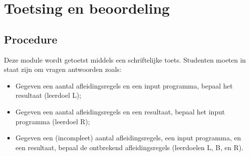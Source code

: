 \section{Toetsing en beoordeling}
	\subsection{Procedure}
		Deze module wordt getoetst middels een schriftelijke toets. Studenten moeten in staat zijn om vragen antwoorden zoals:

		\begin{itemize}
			\item Gegeven een aantal afleidingsregels en een input programma, bepaal het resultaat (leerdoel L);
			\item Gegeven een aantal afleidingsregels en een resultaat, bepaal het input programma (leerdoel R);
			\item Gegeven een (incompleet) aantal afleidingsregels, een input programma, en een resultaat, bepaal de ontbrekend afleidingsregels (leerdoelen L, B, en R).
		\end{itemize}
		\ \\
		